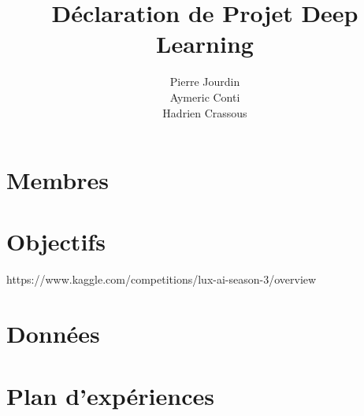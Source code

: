 \documentclass[12pt,a4paper]{article}
\title{Déclaration de Projet Deep Learning}
\author{Pierre Jourdin \\ Aymeric Conti \\ Hadrien Crassous}
\begin{document}
\maketitle

\tableofcontents

\section{Membres}

\section{Objectifs}
https://www.kaggle.com/competitions/lux-ai-season-3/overview

\section{Données}

\section{Plan d'expériences}
\end{document}
